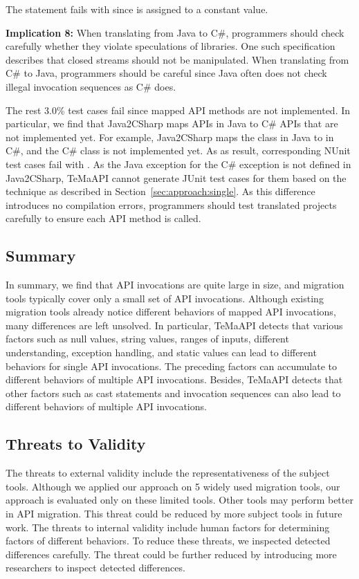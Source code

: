 The  statement fails with  since  is assigned to a constant value.

\textbf{Implication 8:} When translating from Java to C\#, programmers should check carefully whether they violate speculations of libraries. One such specification describes that closed streams should not be manipulated. When translating from C\# to Java, programmers should be careful since Java often does not check illegal invocation sequences as C\# does.


The rest 3.0\% test cases fail since mapped API methods are not implemented. In particular, we find that Java2CSharp maps APIs in Java to C\# APIs that are not implemented yet. For example, Java2CSharp maps the  class in Java to  in C\#, and the C\# class is not implemented yet. As as result, corresponding NUnit test cases fail with . As the Java exception for the C\# exception is not defined in Java2CSharp, TeMaAPI cannot generate JUnit test cases for them based on the technique as described in Section~\ref{sec:approach:single}. As this difference introduces no compilation errors, programmers should test translated projects carefully to ensure each API method is called.

\subsection{Summary}
\label{sec:evaluation:summary}
In summary, we find that API invocations are quite large in size, and migration tools typically cover only a small set of API invocations. Although existing migration tools already notice different behaviors of mapped API invocations, many differences are left unsolved. In particular, TeMaAPI detects that various factors such as null values, string values, ranges of inputs, different understanding, exception handling, and static values can lead to different behaviors for single API invocations. The preceding factors can accumulate to different behaviors of multiple API invocations. Besides, TeMaAPI detects that other factors such as cast statements and invocation sequences can also lead to different behaviors of multiple API invocations.
\subsection{Threats to Validity}
\label{sec:evaluation:threat}
The threats to external validity include the representativeness of the subject tools. Although we applied
our approach on 5 widely used migration tools, our approach is evaluated only on these limited tools. Other tools may perform
better in API migration. This threat could be reduced by more subject tools in future work. The threats to internal validity include human factors for determining factors of different behaviors. To reduce these threats, we inspected detected differences carefully. The threat could be further
reduced by introducing more researchers to inspect detected differences. 